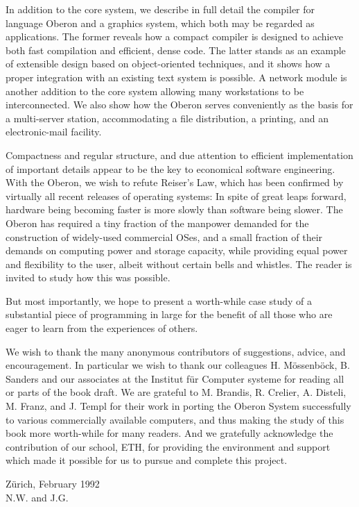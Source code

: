 In addition to the core system, we describe in full detail the compiler for language Oberon and
a graphics system, which both may be regarded as applications. The former reveals how a
compact compiler is designed to achieve both fast compilation and efficient, dense code. The
latter stands as an example of extensible design based on object-oriented techniques, and it
shows how a proper integration with an existing text system is possible. A network module is 
another addition to the core system allowing many workstations to be interconnected. We also show
how the Oberon serves conveniently as the basis for a multi-server station,
accommodating a file distribution, a printing, and an electronic-mail facility.

Compactness and regular structure, and due attention to efficient implementation of important
details appear to be the key to economical software engineering. With the Oberon, we
wish to refute Reiser's Law, which has been confirmed by virtually all recent releases of operating
systems: In spite of great leaps forward, hardware being becoming faster is more slowly than software 
being slower. The Oberon has required a tiny fraction of the manpower demanded for
the construction of widely-used commercial OSes, and a small fraction of their
demands on computing power and storage capacity, while providing equal power and flexibility to
the user, albeit without certain bells and whistles. The reader is invited to study how this was
possible.

But most importantly, we hope to present a worth-while case study of a substantial piece of
programming in large for the benefit of all those who are eager to learn from the experiences of others.

We wish to thank the many anonymous contributors of suggestions, advice, and encouragement.
In particular we wish to thank our colleagues H. Mössenböck, B. Sanders and our associates
at the Institut für Computer systeme for reading all or parts of the book draft. We are grateful
to M. Brandis, R. Crelier, A. Disteli, M. Franz, and J. Templ for their work in porting the Oberon
System successfully to various commercially available computers, and thus making the study of
this book more worth-while for many readers. And we gratefully acknowledge the contribution of
our school, ETH, for providing the environment and support which made it possible for us to
pursue and complete this project.
\begin{flushright}
  Zürich, February 1992 \\
  N.W. and J.G.
\end{flushright}

